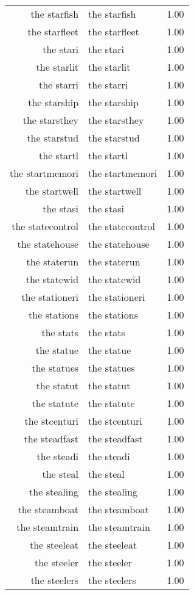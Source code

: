 \begin{table}[ht]
\begin{tabular}{rlr}
  the starfish & the starfish & 1.00 \\ 
  the starfleet & the starfleet & 1.00 \\ 
  the stari & the stari & 1.00 \\ 
  the starlit & the starlit & 1.00 \\ 
  the starri & the starri & 1.00 \\ 
  the starship & the starship & 1.00 \\ 
  the starsthey & the starsthey & 1.00 \\ 
  the starstud & the starstud & 1.00 \\ 
  the startl & the startl & 1.00 \\ 
  the startmemori & the startmemori & 1.00 \\ 
  the startwell & the startwell & 1.00 \\ 
  the stasi & the stasi & 1.00 \\ 
  the statecontrol & the statecontrol & 1.00 \\ 
  the statehouse & the statehouse & 1.00 \\ 
  the staterun & the staterun & 1.00 \\ 
  the statewid & the statewid & 1.00 \\ 
  the stationeri & the stationeri & 1.00 \\ 
  the stations & the stations & 1.00 \\ 
  the stats & the stats & 1.00 \\ 
  the statue & the statue & 1.00 \\ 
  the statues & the statues & 1.00 \\ 
  the statut & the statut & 1.00 \\ 
  the statute & the statute & 1.00 \\ 
  the stcenturi & the stcenturi & 1.00 \\ 
  the steadfast & the steadfast & 1.00 \\ 
  the steadi & the steadi & 1.00 \\ 
  the steal & the steal & 1.00 \\ 
  the stealing & the stealing & 1.00 \\ 
  the steamboat & the steamboat & 1.00 \\ 
  the steamtrain & the steamtrain & 1.00 \\ 
  the steeleat & the steeleat & 1.00 \\ 
  the steeler & the steeler & 1.00 \\ 
  the steelers & the steelers & 1.00 \\ 

\end{tabular}
\end{table}
